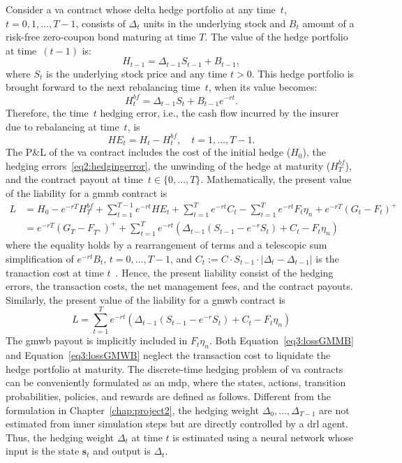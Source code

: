 Consider a \gls{va} contract whose delta hedge portfolio at any time~$t$, $t=0,1,\ldots,T-1$, consists of $\Delta_t$ units in the underlying stock and $B_t$ amount of a risk-free zero-coupon bond maturing at time $T$.
The value of the hedge portfolio at time~$(t-1)$ is:
\begin{equation*}
    H_{t-1} = \Delta_{t-1} S_{t-1} + B_{t-1},
\end{equation*}
where $S_t$ is the underlying stock price and any time $t>0$.
This hedge portfolio is brought forward to the next rebalancing time~$t$, when its value becomes:
\begin{equation*}
    H_{t}^{bf} = \Delta_{t-1} S_{t} + B_{t-1}e^{-rt}.
\end{equation*}
Therefore, the time~$t$ hedging error, i.e., the cash flow incurred by the insurer due to rebalancing at time~$t$, is
\begin{equation}
    HE_t = H_t - H^{bf}_t, \quad t=1,\ldots, T-1.
\end{equation}
The P\&L of the \gls{va} contract includes the cost of the initial hedge ($H_0$), the hedging errors~\eqref{eq2:hedgingerror}, the unwinding of the hedge at maturity ($H^{bf}_T$), and the contract payout at time~$t\in \{0,\ldots,T\}$.
Mathematically, the present value of the liability for a \gls{gmmb} contract is 
\begin{align} \label{eq3:lossGMMB}
L   & = H_0 - e^{-rT} H^{bf}_T + \sum_{t=1}^{T-1} e^{-rt} HE_t + \sum_{t=1}^T e^{-rt} C_t - \sum_{t=1}^T e^{-rt} F_t\eta_n + e^{-rT} (G_t - F_t)^+  \nonumber \\ 
    & = e^{-rT} (G_T - F_{T^+})^+ + \sum_{t=1}^T e^{-rt}  \left( \Delta_{t-1} (S_{t-1} - e^{-r} S_t) + C_t - F_t\eta_n \right) 
\end{align}
where the equality holds by a rearrangement of terms and a telescopic sum simplification of $e^{-rt}B_t$, $t=0,\ldots,T-1$, and $C_t := C \cdot S_{t-1} \cdot |\Delta_t - \Delta_{t-1}|$ is the tranaction cost at time $t$~\citep{garleanu2013dynamic}.
Hence, the present liability consist of the hedging errors, the transaction costs, the net management fees, and the contract payouts.
Similarly, the present value of the liability for a \gls{gmwb} contract is
\begin{equation} \label{eq3:lossGMWB}
L = \sum_{t=1}^T e^{-rt}  \left( \Delta_{t-1} (S_{t-1} - e^{-r} S_t) + C_t - F_t\eta_n \right)
\end{equation}
The \gls{gmwb} payout is implicitly included in $F_t\eta_n$.
Both Equation~\eqref{eq3:lossGMMB} and Equation~\eqref{eq3:lossGMWB} neglect the transaction cost to liquidate the hedge portfolio at maturity.
The discrete-time hedging problem of \gls{va} contracts can be conveniently formulated as an \gls{mdp}, where the states, actions, transition probabilities, policies, and rewards are defined as follows.
Different from the formulation in Chapter~\ref{chap:project2}, the hedging weight $\Delta_0, \ldots, \Delta_{T-1}$ are not estimated from inner simulation steps but are directly controlled by a \gls{drl} agent.
Thus, the hedging weight $\Delta_t$ at time $t$ is estimated using a neural network whose input is the state $\mathbf{s}_t$ and output is $\Delta_t$.

